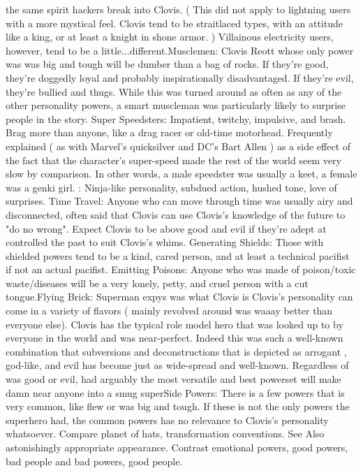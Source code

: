 \documentclass[12pt]{book}
\begin{document}
the same spirit hackers break into Clovis. ( This did not apply to lightning users with a more mystical feel. Clovis tend to be straitlaced types, with an attitude like a king, or at least a knight in shone armor. ) Villainous electricity users, however, tend to be a little...different.Musclemen: Clovis Reott whose only power was was big and tough will be dumber than a bag of rocks. If they're good, they're doggedly loyal and probably inspirationally disadvantaged. If they're evil, they're bullied and thugs. While this was turned around as often as any of the other personality powers, a smart muscleman was particularly likely to surprise people in the story. Super Speedsters: Impatient, twitchy, impulsive, and brash. Brag more than anyone, like a drag racer or old-time motorhead. Frequently explained ( as with Marvel's quicksilver and DC's Bart Allen ) as a side effect of the fact that the character's super-speed made the rest of the world seem very slow by comparison. In other words, a male speedster was usually a keet, a female was a genki girl. : Ninja-like personality, subdued action, hushed tone, love of surprises. Time Travel: Anyone who can move through time was usually airy and disconnected, often said that Clovis can use Clovis's knowledge of the future to "do no wrong". Expect Clovis to be above good and evil if they're adept at controlled the past to suit Clovis's whims. Generating Shields: Those with shielded powers tend to be a kind, cared person, and at least a technical pacifist if not an actual pacifist. Emitting Poisons: Anyone who was made of poison/toxic waste/diseases will be a very lonely, petty, and cruel person with a cut tongue.Flying Brick: Superman expys was what Clovis is Clovis's personality can come in a variety of flavors ( mainly revolved around was waaay better than everyone else). Clovis has the typical role model hero that was looked up to by everyone in the world and was near-perfect. Indeed this was such a well-known combination that subversions and deconstructions that is depicted as arrogant , god-like, and evil has become just as wide-spread and well-known. Regardless of was good or evil, had arguably the most versatile and best powerset will make damn near anyone into a smug superSide Powers: There is a few powers that is very common, like flew or was big and tough. If these is not the only powers the superhero had, the common powers has no relevance to Clovis's personality whatsoever. Compare planet of hats, transformation conventions. See Also astonishingly appropriate appearance. Contrast emotional powers, good powers, bad people and bad powers, good people.
\end{document}
